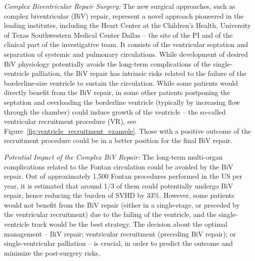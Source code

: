 \smallskip
\textit{Complex Biventricular Repair Surgery:}
The new surgical approaches, such as complex biventricular (BiV) repair\cite{andersen2020_BiVrepair}, represent a novel approach pioneered in the leading institutes, including the Heart Center at the Children's Health, University of Texas Southwestern Medical Center Dallas -- the site of the PI and of the clinical part of the investigative team.  
It consists of the ventricular septation and separation of systemic and pulmonary circulations. While development of desired BiV physiology potentially avoids the long-term complications of the single-ventricle palliation, the BiV repair has intrinsic risks related to the failure of the borderline-size ventricle to sustain the circulation.
While some patients would directly benefit from the BiV repair, in some other patients postponing the septation and overloading the borderline ventricle (typically by increasing flow through the chamber) could induce growth of the ventricle -- the so-called ventricular recruitment procedure (VR), see Figure~\ref{fig:ventricle_recruitment_example}. Those with a positive outcome of the recruitment procedure could be in a better position for the final BiV repair.  





\smallskip
\textit{Potential Impact of the Complex BiV Repair: }
The long-term multi-organ complications related to the Fontan circulation could be avoided by the BiV repair. Out of approximately 1,500 Fontan procedures performed in the US per year, it is estimated that around 1/3 of them could potentially undergo BiV repair, hence reducing the burden of SVHD by 33\%. 
However, some patients would not benefit from the BiV repair (either in a single-stage, or preceded by the ventricular recruitment) due to the failing of the ventricle, and the single-ventricle track would be the best strategy. The decision about the optimal 
management -- BiV repair; ventricular recruitment (preceding BiV repair); or single-ventricular palliation -- 
is crucial, in order to predict the outcome and minimize the post-surgery risks.  

